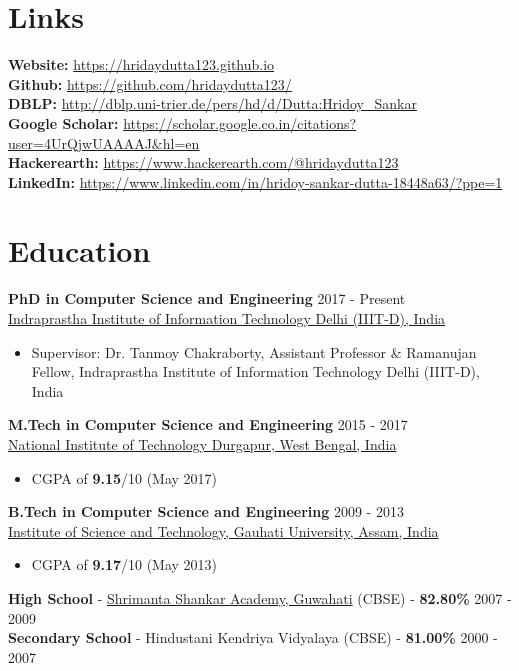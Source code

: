 \documentclass[margin, centered]{res}
\begin{document}
\begin{resume}
\section{Links}
\textbf{Website:} \url{https://hridaydutta123.github.io} \\
\textbf{Github:} \url{https://github.com/hridaydutta123/} \\
\textbf{DBLP:} \url{http://dblp.uni-trier.de/pers/hd/d/Dutta:Hridoy_Sankar} \\
\textbf{Google Scholar:} \url{https://scholar.google.co.in/citations?user=4UrQjwUAAAAJ&hl=en} \\
\textbf{Hackerearth:} \url{https://www.hackerearth.com/@hridaydutta123} \\
\textbf{LinkedIn:} \url{https://www.linkedin.com/in/hridoy-sankar-dutta-18448a63/?ppe=1} \\


\section{Education}
\textbf{PhD in Computer Science and Engineering} \hfill 2017 - Present \\
\href{http://www.iiitd.ac.in/}{Indraprastha Institute of Information Technology Delhi (IIIT-D), India}
\begin{itemize}
 \item Supervisor: Dr. Tanmoy Chakraborty, Assistant Professor \& Ramanujan Fellow, Indraprastha Institute of Information Technology Delhi (IIIT-D), India
\end{itemize}
\textbf{M.Tech in Computer Science and Engineering} \hfill 2015 - 2017 \\
\href{http://www.nitdgp.ac.in/}{National Institute of Technology Durgapur, West Bengal, India}
\begin{itemize}
 \item CGPA of \textbf{9.15}/10 (May 2017)
\end{itemize}
\textbf{B.Tech in Computer Science and Engineering} \hfill 2009 - 2013 \\
\href{http://www.gauhati.ac.in/}{Institute of Science and Technology, Gauhati University, Assam, India}
\begin{itemize}
 \item CGPA of \textbf{9.17}/10 (May 2013)
\end{itemize}
\textbf{High School} - \href{http://www.ssa-school.org/}{Shrimanta Shankar Academy, Guwahati} (CBSE) - \textbf{82.80\%} \hfill 2007 - 2009 \\
\textbf{Secondary School} - Hindustani Kendriya Vidyalaya (CBSE) - \textbf{81.00\%} \hfill 2000 - 2007
 

\end{resume}
\end{document}
